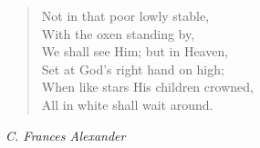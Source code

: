 \begin{verse}
Not in that poor lowly stable,\\
\hspace*{2em}With the oxen standing by,\\
We shall see Him; but in Heaven,\\
\hspace*{2em}Set at God's right hand on high;\\
When like stars His children crowned,\\
All in white shall wait around.%
\end{verse}

\vspace{0.5\baselineskip}
\noindent\textit{C. Frances Alexander}

\newpage
